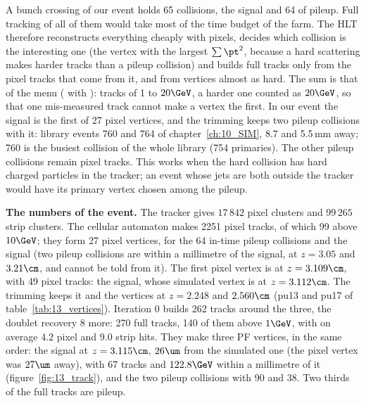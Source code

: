 \begin{plainwords}
A bunch crossing of our event holds 65 collisions, the signal and 64 of pileup. Full tracking of all of them would take
most of the time budget of the farm. The HLT therefore reconstructs everything cheaply with pixels, decides which
collision is the interesting one (the vertex with the largest $\sum\pt^2$, because a hard scattering makes harder
tracks than a pileup collision) and builds full tracks only from the pixel tracks that come from it, and from vertices
almost as hard. The sum is that of the menu ( with
): tracks of 1 to $20\GeV$, a harder one counted as $20\GeV$, so that one
mis-measured track cannot make a vertex the first. In our event the signal is the first of 27 pixel vertices, and the
trimming keeps two pileup collisions with it: library events 760 and 764 of chapter~\ref{ch:10_SIM}, 8.7 and 5.5\,mm
away; 760 is the busiest collision of the whole library (754 primaries). The other pileup collisions remain pixel
tracks. This works when the hard collision has hard charged particles in the tracker; an event whose jets are both
outside the tracker would have its primary vertex chosen among the pileup.
\end{plainwords}

\textbf{The numbers of the event.} The tracker gives $17\,842$ pixel clusters and $99\,265$ strip clusters. The
cellular automaton makes 2251 pixel tracks, of which 99 above $10\GeV$; they form 27 pixel vertices, for the 64
in-time pileup collisions and the signal (two pileup collisions are within a millimetre of the signal, at $z=3.05$ and
$3.21\cm$, and cannot be told from it). The first pixel vertex is at $z=3.109\cm$, with 49 pixel tracks: the
signal, whose simulated vertex is at $z=3.112\cm$. The trimming keeps it and the vertices at $z=2.248$ and
$2.560\cm$ (pu13 and pu17 of table~\ref{tab:13_vertices}). Iteration 0 builds 262 tracks around the three, the
doublet recovery 8 more: 270 full tracks, 140 of them above $1\GeV$, with on average 4.2 pixel and 9.0 strip hits.
They make three PF vertices, in the same order: the signal at $z=3.115\cm$, $26\um$ from the simulated one (the pixel
vertex was $27\um$ away), with 67 tracks and $122.8\GeV$ within a millimetre of it (figure~\ref{fig:13_track}), and the
two pileup collisions with 90 and 38. Two thirds of the full tracks are pileup.

